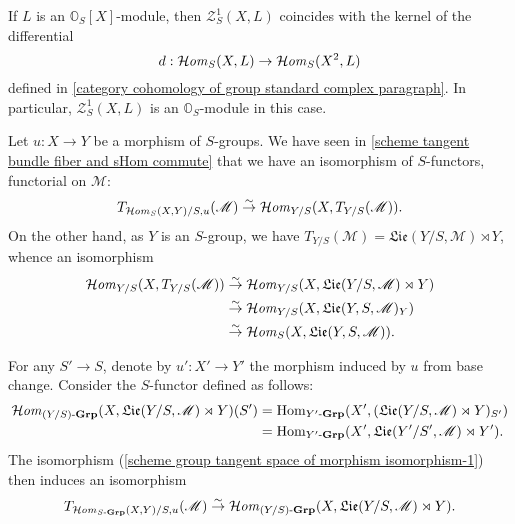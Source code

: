 If $L$ is an $\mathbb{O}_S[X]$-module, then $\mathcal{Z}_S^1(X,L)$ coincides with the kernel of the differential
\[d:\operatorname{\mathcal{H}\hspace*{-0.4pt}\textit{om}\hspace{0.5pt}}_S(X,L)\to\operatorname{\mathcal{H}\hspace*{-0.4pt}\textit{om}\hspace{0.5pt}}_S(X^2,L)\]
defined in \ref{category cohomology of group standard complex paragraph}. In particular, $\mathcal{Z}_S^1(X,L)$ is an $\mathbb{O}_S$-module in this case.\par

Let $u:X\to Y$ be a morphism of $S$-groups. We have seen in \cref{scheme tangent bundle fiber and sHom commute} that we have an isomorphism of $S$-functors, functorial on $\mathscr{M}$:
\begin{equation}\label{scheme group tangent space of morphism isomorphism-1}
T_{\operatorname{\mathcal{H}\hspace*{-0.4pt}\textit{om}\hspace{0.5pt}}_{S}(X,Y)/S,u}(\mathscr{M})\stackrel{\sim}{\to} \operatorname{\mathcal{H}\hspace*{-0.4pt}\textit{om}\hspace{0.5pt}}_{Y/S}(X,T_{Y/S}(\mathscr{M})).
\end{equation}
On the other hand, as $Y$ is an $S$-group, we have $T_{Y/S}(\mathscr{M})=\mathfrak{Lie}(Y/S,\mathscr{M})\rtimes Y$, whence an isomorphism
\begin{equation}\label{scheme group tangent space of morphism isomorphism-2}
\begin{aligned}
\operatorname{\mathcal{H}\hspace*{-0.4pt}\textit{om}\hspace{0.5pt}}_{Y/S}(X,T_{Y/S}(\mathscr{M}))&\stackrel{\sim}{\to}\operatorname{\mathcal{H}\hspace*{-0.4pt}\textit{om}\hspace{0.5pt}}_{Y/S}(X,\mathfrak{Lie}(Y/S,\mathscr{M})\rtimes Y)\\
&\stackrel{\sim}{\to}\operatorname{\mathcal{H}\hspace*{-0.4pt}\textit{om}\hspace{0.5pt}}_{Y/S}(X,\mathfrak{Lie}(Y,S,\mathscr{M})_Y)\\
&\stackrel{\sim}{\to}\operatorname{\mathcal{H}\hspace*{-0.4pt}\textit{om}\hspace{0.5pt}}_S(X,\mathfrak{Lie}(Y,S,\mathscr{M})).
\end{aligned}
\end{equation}

For any $S'\to S$, denote by $u':X'\to Y'$ the morphism induced by $u$ from base change. Consider the $S$-functor defined as follows:
\begin{align*}
\operatorname{\mathcal{H}\hspace*{-0.4pt}\textit{om}\hspace{0.5pt}}_{(Y/S)\textup{-}\mathbf{Grp}}(X,\mathfrak{Lie}(Y/S,\mathscr{M})\rtimes Y)(S')&=\mathrm{Hom}_{Y'\textup{-}\mathbf{Grp}}(X',(\mathfrak{Lie}(Y/S,\mathscr{M})\rtimes Y)_{S'})\\
&=\mathrm{Hom}_{Y'\textup{-}\mathbf{Grp}}(X',\mathfrak{Lie}(Y'/S',\mathscr{M})\rtimes Y').
\end{align*}
The isomorphism (\ref{scheme group tangent space of morphism isomorphism-1}) then induces an isomorphism
\begin{equation}\label{scheme group tangent space of morphism isomorphism-3}
T_{\operatorname{\mathcal{H}\hspace*{-0.4pt}\textit{om}\hspace{0.5pt}}_{S\textup{-}\mathbf{Grp}}(X,Y)/S,u}(\mathscr{M})\stackrel{\sim}{\to} \operatorname{\mathcal{H}\hspace*{-0.4pt}\textit{om}\hspace{0.5pt}}_{(Y/S)\textup{-}\mathbf{Grp}}(X,\mathfrak{Lie}(Y/S,\mathscr{M})\rtimes Y).
\end{equation}

